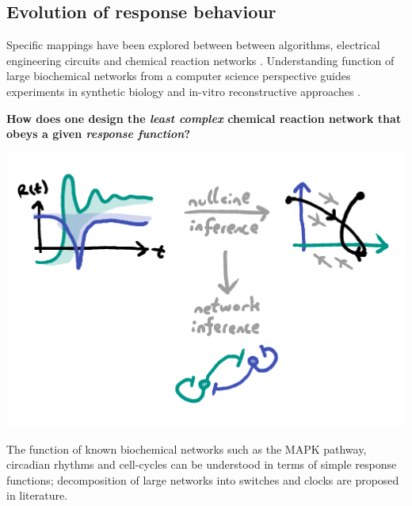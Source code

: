 \documentclass[a0,portrait]{a0poster}
\begin{document}
\begin{multicols}{3} %

\section{Evolution of response behaviour}

Specific mappings have been explored between between algorithms, electrical
engineering circuits and chemical reaction networks \cite{Dalchau2014ComputationalNetworks}. Understanding function
of large biochemical networks from a computer science perspective guides experiments
in synthetic biology and in-vitro reconstructive approaches \cite{Loose2011MinMinE}.
\\
\begin{tcolorbox}[boxrule=2pt,arc=3.4pt,boxsep=2mm]
\begin{center}\color{DarkRed}
\textbf{How does one design the \textit{least complex} chemical
reaction network that obeys a given \textit{response function}?}
\end{center}
\end{tcolorbox}
\begin{center}
\includegraphics[width=1.0\linewidth]{inference}
\end{center}\noindent
The function of known biochemical networks such as the MAPK pathway,
circadian rhythms and cell-cycles can be understood in terms of simple
response functions; decomposition of large networks into switches and
clocks are proposed in literature.
\\\\

\end{multicols}
\end{document}
